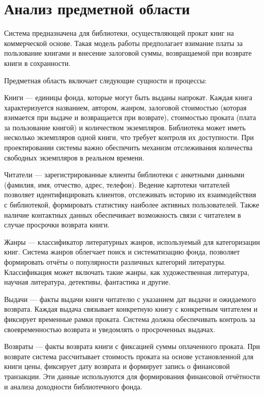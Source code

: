 \documentclass[14pt]{extreport}
\begin{document}
	\section{Анализ предметной области}

	Система предназначена для библиотеки, осуществляющей прокат книг на коммерческой основе. Такая модель работы предполагает взимание платы за пользование книгами и внесение залоговой суммы, возвращаемой при возврате книги в сохранности.
	
	Предметная область включает следующие сущности и процессы:
	
	Книги --- единицы фонда, которые могут быть выданы напрокат. Каждая книга характеризуется названием, автором, жанром, залоговой стоимостью (которая взимается при выдаче и возвращается при возврате), стоимостью проката (плата за пользование книгой) и количеством экземпляров. Библиотека может иметь несколько экземпляров одной книги, что требует контроля их доступности. При проектировании системы важно обеспечить механизм отслеживания количества свободных экземпляров в реальном времени.
	
	Читатели --- зарегистрированные клиенты библиотеки с анкетными данными (фамилия, имя, отчество, адрес, телефон). Ведение картотеки читателей позволяет идентифицировать клиентов, отслеживать историю их взаимодействия с библиотекой, формировать статистику наиболее активных пользователей. Также наличие контактных данных обеспечивает возможность связи с читателем в случае просрочки возврата книги.
	
	Жанры --- классификатор литературных жанров, используемый для категоризации книг. Система жанров облегчает поиск и систематизацию фонда, позволяет формировать отчёты о популярности различных категорий литературы. Классификация может включать такие жанры, как художественная литература, научная литература, детективы, фантастика и другие.
	
	Выдачи --- факты выдачи книги читателю с указанием дат выдачи и ожидаемого возврата. Каждая выдача связывает конкретную книгу с конкретным читателем и фиксирует временные рамки проката. Система должна обеспечивать контроль за своевременностью возврата и уведомлять о просроченных выдачах.
	
	Возвраты --- факты возврата книги с фиксацией суммы оплаченного проката. При возврате система рассчитывает стоимость проката на основе установленной для книги цены, фиксирует дату возврата и формирует запись о финансовой транзакции. Эти данные используются для формирования финансовой отчётности и анализа доходности библиотечного фонда.
	
\end{document}
